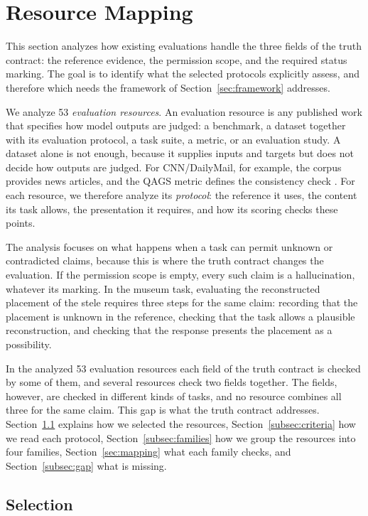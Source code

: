 \documentclass{clv2025}
\begin{document}
\section{Resource Mapping}\label{sec:methodology}

This section analyzes how existing evaluations handle the three fields of
the truth contract: the reference evidence, the permission scope, and the
required status marking. The goal is to identify what the selected protocols
explicitly assess, and therefore which needs the framework of
Section~\ref{sec:framework} addresses.

We analyze 53 \emph{evaluation resources}. An evaluation resource is any
published work that specifies how model outputs are judged: a benchmark, a
dataset together with its evaluation protocol, a task suite, a metric, or
an evaluation study. A dataset alone is not enough, because it supplies
inputs and targets but does not decide how outputs are judged. For
CNN/DailyMail, for example, the corpus provides news articles, and the QAGS
metric defines the consistency check \citep{hermann_teaching_2015,
wang_asking_2020}. For each resource, we therefore analyze its
\emph{protocol}: the reference it uses, the content its task allows, the
presentation it requires, and how its scoring checks these points.

The analysis focuses on what happens when a task can permit unknown or
contradicted claims, because this is where the truth contract changes the
evaluation. If the permission scope is empty, every such claim is a
hallucination, whatever its marking. In the museum task, evaluating the
reconstructed placement of the stele requires three steps for the same
claim: recording that the placement is unknown in the reference, checking
that the task allows a plausible reconstruction, and checking that the
response presents the placement as a possibility.

In the analyzed 53 evaluation resources each field of the truth contract is
checked by some of them, and several resources check two fields together.
The fields, however, are checked in different kinds of tasks, and no
resource combines all three for the same claim. This gap is what the truth
contract addresses. Section~\ref{subsec:selection} explains how we selected
the resources, Section~\ref{subsec:criteria} how we read each protocol,
Section~\ref{subsec:families} how we group the resources into four
families, Section~\ref{sec:mapping} what each family checks, and
Section~\ref{subsec:gap} what is missing.
\subsection{Selection}\label{subsec:selection}
\end{document}

